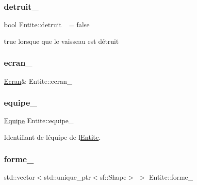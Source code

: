 \subsubsection{\texorpdfstring{detruit\+\_\+}{detruit\_}}
{\footnotesize\ttfamily bool Entite\+::detruit\+\_\+ = false\hspace{0.3cm}{\ttfamily [protected]}}



true lorsque que le vaisseau est détruit 

\mbox{\label{class_entite_a45a5a3f7a0f4690aa0d075ba2af172a3}} 
\subsubsection{\texorpdfstring{ecran\+\_\+}{ecran\_}}
{\footnotesize\ttfamily \mbox{\hyperlink{class_ecran}{Ecran}}\& Entite\+::ecran\+\_\+\hspace{0.3cm}{\ttfamily [protected]}}

\mbox{\label{class_entite_a5fe5eca94bde526873a68163a94011ef}} 
\subsubsection{\texorpdfstring{equipe\+\_\+}{equipe\_}}
{\footnotesize\ttfamily \mbox{\hyperlink{constantes_8h_a08fa5554288d5031a8f3bb83cc04ee83}{Equipe}} Entite\+::equipe\+\_\+\hspace{0.3cm}{\ttfamily [protected]}}



Identifiant de l\textquotesingle{}équipe de l\textquotesingle{}\mbox{\hyperlink{class_entite}{Entite}}. 

\mbox{\label{class_entite_aa6bbda9a40f701f273c344406a6f5122}} 
\subsubsection{\texorpdfstring{forme\+\_\+}{forme\_}}
{\footnotesize\ttfamily std\+::vector$<$std\+::unique\+\_\+ptr$<$sf\+::\+Shape$>$ $>$ Entite\+::forme\+\_\+\hspace{0.3cm}{\ttfamily [protected]}}



